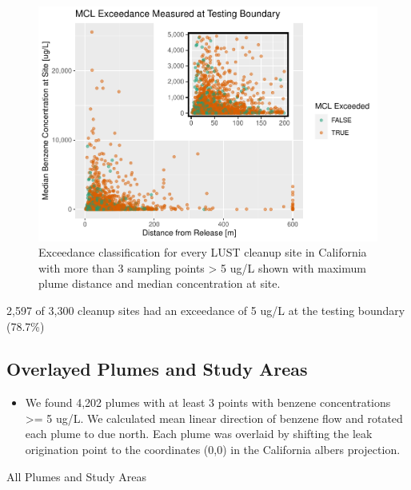 \documentclass[draft,linenumbers]{agujournal2018}
\providecommand{\tightlist}{%
  \setlength{\itemsep}{0pt}\setlength{\parskip}{0pt}}
\begin{document}
\begin{figure}[h]
\includegraphics{CA_Benzene_Plumes_files/figure-latex/boundaryExceedance-1} \caption{Exceedance classification for every LUST cleanup site in California with more than 3 sampling points > 5 ug/L shown with maximum plume distance and median concentration at site.}\label{fig:boundaryExceedance}
\end{figure}

2,597 of 3,300 cleanup sites had an exceedance of 5 ug/L at the testing
boundary (78.7\%)

\subsection{Overlayed Plumes and Study Areas}

\begin{itemize}
\tightlist
\item
  We found 4,202 plumes with at least 3 points with benzene
  concentrations \textgreater= 5 ug/L. We calculated mean linear
  direction of benzene flow and rotated each plume to due north. Each
  plume was overlaid by shifting the leak origination point to the
  coordinates (0,0) in the California albers projection.
\end{itemize}

All Plumes and Study Areas
\end{document}
